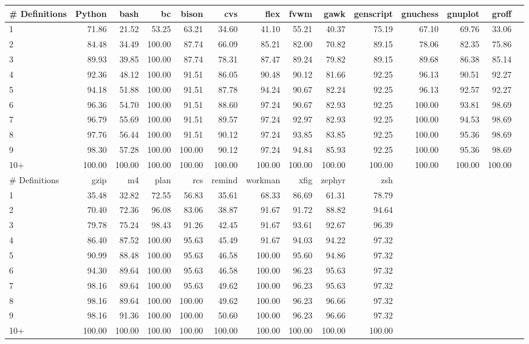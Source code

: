 \begin{tabular}{|l|r|r|r|r|r|r|r|r|r|r|r|r|r|}\hline
\# Definitions & Python & bash & bc & bison & cvs & flex & fvwm & gawk & genscript & gnuchess & gnuplot & groff\\\hline
1 & 71.86 & 21.52 & 53.25 & 63.21 & 34.60 & 41.10 & 55.21 & 40.37 & 75.19 & 67.10 & 69.76 & 33.06\\\hline
2 & 84.48 & 34.49 & 100.00 & 87.74 & 66.09 & 85.21 & 82.00 & 70.82 & 89.15 & 78.06 & 82.35 & 75.86\\\hline
3 & 89.93 & 39.85 & 100.00 & 87.74 & 78.31 & 87.47 & 89.24 & 79.82 & 89.15 & 89.68 & 86.38 & 85.14\\\hline
4 & 92.36 & 48.12 & 100.00 & 91.51 & 86.05 & 90.48 & 90.12 & 81.66 & 92.25 & 96.13 & 90.51 & 92.27\\\hline
5 & 94.18 & 51.88 & 100.00 & 91.51 & 87.78 & 94.24 & 90.67 & 82.24 & 92.25 & 96.13 & 92.57 & 92.27\\\hline
6 & 96.36 & 54.70 & 100.00 & 91.51 & 88.60 & 97.24 & 90.67 & 82.93 & 92.25 & 100.00 & 93.81 & 98.69\\\hline
7 & 96.79 & 55.69 & 100.00 & 91.51 & 89.57 & 97.24 & 92.97 & 82.93 & 92.25 & 100.00 & 94.53 & 98.69\\\hline
8 & 97.76 & 56.44 & 100.00 & 91.51 & 90.12 & 97.24 & 93.85 & 83.85 & 92.25 & 100.00 & 95.36 & 98.69\\\hline
9 & 98.30 & 57.28 & 100.00 & 100.00 & 90.12 & 97.24 & 94.84 & 85.93 & 92.25 & 100.00 & 95.36 & 98.69\\\hline
10+ & 100.00 & 100.00 & 100.00 & 100.00 & 100.00 & 100.00 & 100.00 & 100.00 & 100.00 & 100.00 & 100.00 & 100.00\\\hline
\# Definitions & gzip & m4 & plan & rcs & remind & workman & xfig & zephyr & zsh\\\hline
1 & 35.48 & 32.82 & 72.55 & 56.83 & 35.61 & 68.33 & 86.69 & 61.31 & 78.79\\\hline
2 & 70.40 & 72.36 & 96.08 & 83.06 & 38.87 & 91.67 & 91.72 & 88.82 & 94.64\\\hline
3 & 79.78 & 75.24 & 98.43 & 91.26 & 42.45 & 91.67 & 93.61 & 92.67 & 96.39\\\hline
4 & 86.40 & 87.52 & 100.00 & 95.63 & 45.49 & 91.67 & 94.03 & 94.22 & 97.32\\\hline
5 & 90.99 & 88.48 & 100.00 & 95.63 & 46.58 & 100.00 & 95.60 & 94.86 & 97.32\\\hline
6 & 94.30 & 89.64 & 100.00 & 95.63 & 46.58 & 100.00 & 96.23 & 95.63 & 97.32\\\hline
7 & 98.16 & 89.64 & 100.00 & 95.63 & 49.62 & 100.00 & 96.23 & 95.63 & 97.32\\\hline
8 & 98.16 & 89.64 & 100.00 & 100.00 & 49.62 & 100.00 & 96.23 & 96.66 & 97.32\\\hline
9 & 98.16 & 91.36 & 100.00 & 100.00 & 50.60 & 100.00 & 96.23 & 96.66 & 97.32\\\hline
10+ & 100.00 & 100.00 & 100.00 & 100.00 & 100.00 & 100.00 & 100.00 & 100.00 & 100.00\\\hline
\end{tabular}
